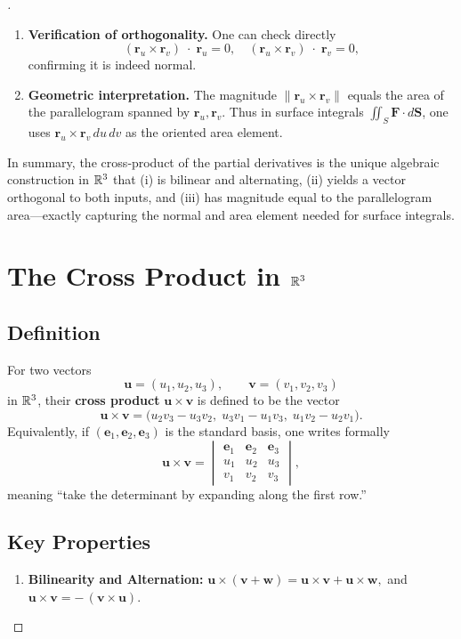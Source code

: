 \documentclass[11pt,openany]{article}
\renewcommand{\emph}[1]{\textbf{#1}}
\begin{document}
\begin{proof}[\sol]
\begin{enumerate}
	\item \textbf{Verification of orthogonality.}  One can check directly
	\[
	(\mathbf r_u\times\mathbf r_v)\;\cdot\;\mathbf r_u
	=0,
	\quad
	(\mathbf r_u\times\mathbf r_v)\;\cdot\;\mathbf r_v
	=0,
	\]
	confirming it is indeed normal.
	
	\item \textbf{Geometric interpretation.}  The magnitude
	\(\|\mathbf r_u\times\mathbf r_v\|\) equals the area of the parallelogram spanned by \(\mathbf r_u,\mathbf r_v\).  Thus in surface integrals
	\(\iint_S \mathbf F\cdot d\mathbf S\), one uses
	\(\mathbf r_u\times\mathbf r_v\,du\,dv\) as the oriented area element.
	
\end{enumerate}

\noindent In summary, the cross‐product of the partial derivatives is the unique algebraic construction in \(\mathbb{R}^3\) that (i) is bilinear and alternating, (ii) yields a vector orthogonal to both inputs, and (iii) has magnitude equal to the parallelogram area—exactly capturing the normal and area element needed for surface integrals.

\section*{The Cross Product in \(\mathbb{R}^3\)}

\subsection*{Definition}
For two vectors
\[
\mathbf u = (u_1,u_2,u_3),
\qquad
\mathbf v = (v_1,v_2,v_3)
\]
in \(\mathbb{R}^3\), their \emph{cross product} \(\mathbf u \times \mathbf v\) is defined to be the vector
\[
\mathbf u \times \mathbf v
=
\bigl(
u_2v_3 - u_3v_2,\;
u_3v_1 - u_1v_3,\;
u_1v_2 - u_2v_1
\bigr).
\]
Equivalently, if \((\mathbf e_1,\mathbf e_2,\mathbf e_3)\) is the standard basis, one writes formally
\[
\mathbf u \times \mathbf v
= 
\begin{vmatrix}
	\mathbf e_1 & \mathbf e_2 & \mathbf e_3\\
	u_1         & u_2         & u_3         \\
	v_1         & v_2         & v_3
\end{vmatrix},
\]
meaning “take the determinant by expanding along the first row.”

\subsection*{Key Properties}
\begin{enumerate}
	\item \textbf{Bilinearity and Alternation:}
	\(\mathbf u\times(\mathbf v+\mathbf w)
	=\mathbf u\times\mathbf v
	+\mathbf u\times\mathbf w,\)
	and
	\(\mathbf u\times\mathbf v = -\,(\mathbf v\times\mathbf u).\)
	

\end{enumerate}
\end{proof}
\end{document}
